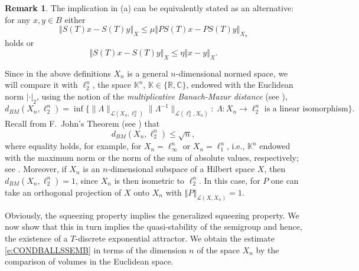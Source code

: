 \documentclass[a4paper,12pt,reqno]{amsart}
\theoremstyle{plain}
\theoremstyle{definition}
\newtheorem{rem}[lem]{Remark}
\numberwithin{equation}{section}
\newcommand{\R}{\mathbb{R}}
\newcommand{\C}{\mathbb{C}}
\newcommand{\K}{\mathbb{K}}
\newcommand{\norm}[1]{\left\Vert#1\right\Vert}
\renewcommand{\leq}{\leqslant}
\begin{document}
\begin{rem}
The implication in (a) can be equivalently stated as an alternative: for any $x,y\in B$ either
\begin{equation*}
\norm{S(T)x-S(T)y}_{X}\leq\mu\norm{PS(T)x-PS(T)y}_{X_n}
\end{equation*}
holds or
\begin{equation*}
\norm{S(T)x-S(T)y}_{X}\leq\eta\norm{x-y}_{X}.
\end{equation*}
\end{rem}

Since in the above definitions $X_n$ is a general $n$-dimensional normed space, we will compare it with $\ell^n_2$, the space $\K^n$, $\mathbb{K}\in\{\R,\C\}$, endowed with the Euclidean norm $|\cdot|_2$, using the notion of the \emph{multiplicative Banach-Mazur distance} (see \cite[II.E.6]{wojtaszczyk}), 
\begin{equation*}
d_{BM}(X_n,\ell^n_2)=\inf\{\|\Lambda\|_{\mathcal{L}(X_n,\ell^n_2)}\|\Lambda^{-1}\|_{\mathcal{L}(\ell^n_2,X_n)}:\  \Lambda\colon X_n\to\ell^n_2\text{ is a linear isomorphism}\}.
\end{equation*} 
Recall from F.~John's Theorem (see \cite[Corollary III.B.9]{wojtaszczyk}) that
\begin{equation}\label{e:JOHN}
d_{BM}(X_n,\ell^n_2)\leq\sqrt{n},
\end{equation} 
where equality holds, for example, for $X_n=\ell^{n}_\infty$ or $X_n=\ell^{n}_1$, i.e., $\K^n$ endowed with the maximum norm or the norm of the sum of absolute values, respectively; see \cite[Proposition II.E.8]{wojtaszczyk}. Moreover, if $X_n$ is an $n$-dimensional subspace of a Hilbert space $X$, then $d_{BM}(X_n,\ell^n_2)=1$, since $X_n$ is then isometric to $\ell^n_2$. In this case, for $P$ one can take an orthogonal projection of $X$ onto $X_n$ with $\norm{P}_{\mathcal{L}(X,X_n)}=1$. 

Obviously, the squeezing property implies the generalized squeezing property. We now show that this in turn implies the quasi-stability of the semigroup and hence, the existence of a $T$-discrete exponential attractor. We obtain the estimate \eqref{e:CONDBALLSSEMB} in terms of the dimension $n$ of the space $X_n$ by the comparison of volumes in the Euclidean space.
\end{document}
